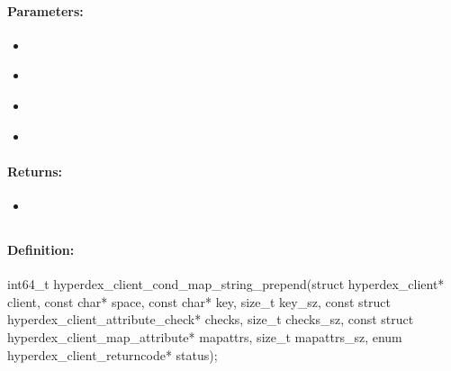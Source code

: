 \paragraph{Parameters:}
\begin{itemize}[noitemsep]
\item {}\\

\item {}\\

\item {}\\

\item {}\\

\end{itemize}

\paragraph{Returns:}
\begin{itemize}[noitemsep]
\item {}\\

\end{itemize}

\pagebreak
\subsection{}
\label{api:c:cond_map_string_prepend}


\paragraph{Definition:}
\begin{ccode}
int64_t hyperdex_client_cond_map_string_prepend(struct hyperdex_client* client,
        const char* space,
        const char* key, size_t key_sz,
        const struct hyperdex_client_attribute_check* checks, size_t checks_sz,
        const struct hyperdex_client_map_attribute* mapattrs, size_t mapattrs_sz,
        enum hyperdex_client_returncode* status);
\end{ccode}

